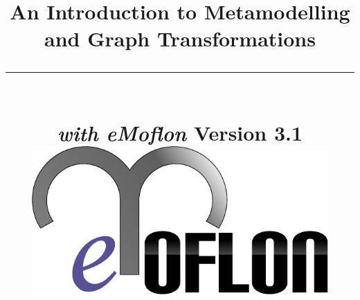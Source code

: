 \title{
\flushright
{\LARGE\bfseries An Introduction to Metamodelling\\
and Graph Transformations}
\noindent\rule[-1ex]{\textwidth}{5pt}\\[2.5ex]
\hfill\emph{\LARGE\bfseries with eMoflon}
\flushleft
{\small Version 3.1}
\flushright
\includegraphics[width=0.85\textwidth]{pics/eMoflon3} 
}

\date{}  
\author{} 